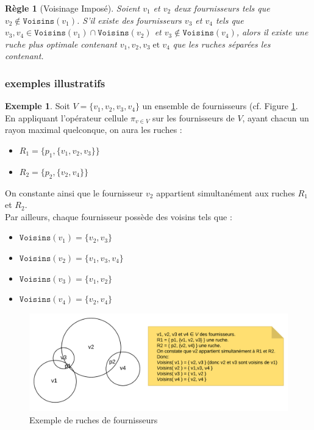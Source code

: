 \documentclass[a4paper,12pt]{book}
\theoremstyle{break}
\theoremstyle{break}
\theoremstyle{break}
\theoremstyle{break}
\newtheorem*{constraint}{Règle}
\theoremstyle{definition}
\newtheorem*{example}{Exemple}
\theoremstyle{remark}
\begin{document}
\begin{constraint}[Voisinage Imposé]
Soient $v_1$ et $v_2$ deux fournisseurs tels que $v_2 \notin \texttt{Voisins}(v_1)$. S'il existe des fournisseurs $v_3$ et $v_4$ tels que $v_3, v_4 \in \texttt{Voisins}(v_1) \cap \texttt{Voisins}(v_2)$ et $v_3 \notin \texttt{Voisins}(v_4)$, alors il existe une ruche plus optimale contenant $v_1, v_2, v_3\; \text{et}\; v_4$ que les ruches séparées les contenant.
\end{constraint}

\subsubsection{exemples illustratifs}
\begin{example}
Soit $V = \{v_1, v_2, v_3, v_4\}$ un ensemble de fournisseurs (cf. Figure \ref{fig:exemple_introductif_1}.\\
En appliquant l'opérateur cellule $\pi_{v \in V}$ sur les fournisseurs de $V$, ayant chacun un rayon maximal quelconque, on aura les ruches :
\begin{itemize}
  \item{$R_1 = \{p_1, \{v_1, v_2, v_3\}\}$}
  \item{$R_2 = \{p_2, \{v_2, v_4\}\}$}
\end{itemize}
On constante ainsi que le fournisseur $v_2$ appartient simultanément aux ruches $R_1$ et $R_2$.\\
Par ailleurs, chaque fournisseur possède des voisins tels que :
\begin{itemize}
  \item{$\texttt{Voisins}(v_1) = \{v_2, v_3\}$}
  \item{$\texttt{Voisins}(v_2) = \{v_1, v_3, v_4\}$}
  \item{$\texttt{Voisins}(v_3) = \{v_1, v_2\}$}
  \item{$\texttt{Voisins}(v_4) = \{v_2, v_4\}$}
\end{itemize}

\begin{figure}
  \centering
  \includegraphics[scale=0.3]{images/exemple_introductif1.png}
  \caption{Exemple de ruches de fournisseurs}
  \label{fig:exemple_introductif_1}
\end{figure}
\end{example}
\end{document}

